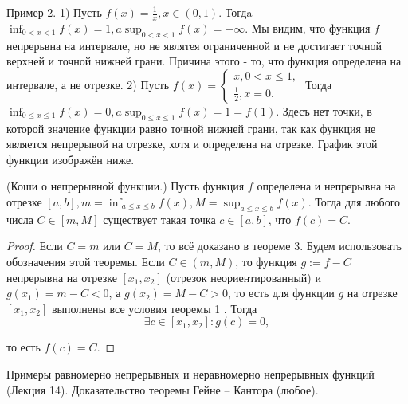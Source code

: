 Пример 2. 1) Пусть $f(x)=\frac{1}{x}, x \in(0,1)$. Тогдa $\inf _{0<x<1} f(x)=1, a \sup _{0<x<1} f(x)=+\infty$. Мы видим, что функция $f$ непрерьвна на интервале, но не являтея ограниченной и не достигает точной верхней и точной нижней грани. Причина этого - то, что функция определена на интервале, а не отрезке.
2) Пусть $f(x)=\left\{\begin{array}{l}x, 0<x \leq 1, \\ \frac{1}{2}, x=0 .\end{array}\right.$ Тогда $\inf _{0 \leq x \leq 1} f(x)=0, a \sup _{0 \leq x \leq 1} f(x)=1=f(1)$. Здесъ нет точки, в которой значение функции равно точной нижней грани, так как функция не является непрерывой на отрезке, хотя и определена на отрезке. График этой функции изображён ниже.
\begin{theorem}
    (Коши о непрерывной функции.) Пусть функция $f$ определена и непрерывна на отрезке $[a, b], m=\inf _{a \leq x \leq b} f(x), M=\sup _{a \leq x \leq b} f(x)$. Тогда для любого числа $C \in[m, M]$ существует такая точка $c \in[a, b]$, что $f(c)=C$.
\end{theorem}

\begin{proof}
    Если $C=m$ или $C=M$, то всё доказано в теореме 3. Будем использовать обозначения этой теоремы. Если $C \in(m, M)$, то функция $g:=f-C$ непрерывна на отрезке $\left[x_1, x_2\right]$ (отрезок неориентированный) и $g\left(x_1\right)=m-C<0$, а $g\left(x_2\right)=M-C>0$, то есть для функции $g$ на отрезке $\left[x_1, x_2\right]$ выполнены все условия теоремы 1 . Тогда
    $$
        \exists c \in\left[x_1, x_2\right]: g(c)=0,
    $$

    то есть $f(c)=C$.
\end{proof}

\newpage

\begin{problem}
Примеры равномерно непрерывных и неравномерно непрерывных функций (Лекция
14). Доказательство теоремы Гейне – Кантора (любое).
\end{problem}

